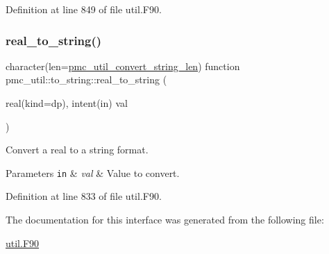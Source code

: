 Definition at line 849 of file util.\+F90.

\mbox{\label{interfacepmc__util_1_1to__string_aa387a4b44390560a847925ee65cc3e57}} 
\subsubsection{\texorpdfstring{real\+\_\+to\+\_\+string()}{real\_to\_string()}}
{\footnotesize\ttfamily character(len=\mbox{\hyperlink{namespacepmc__util_afd468d26aef28509c08087ba8e59089a}{pmc\+\_\+util\+\_\+convert\+\_\+string\+\_\+len}}) function pmc\+\_\+util\+::to\+\_\+string\+::real\+\_\+to\+\_\+string (\begin{DoxyParamCaption}\item[{real(kind=dp), intent(in)}]{val }\end{DoxyParamCaption})}



Convert a real to a string format. 


\begin{DoxyParams}[1]{Parameters}
\mbox{\tt in}  & {\em val} & Value to convert. \\
\hline
\end{DoxyParams}


Definition at line 833 of file util.\+F90.



The documentation for this interface was generated from the following file\+:\begin{DoxyCompactItemize}
\item 
\mbox{\hyperlink{util_8_f90}{util.\+F90}}\end{DoxyCompactItemize}
